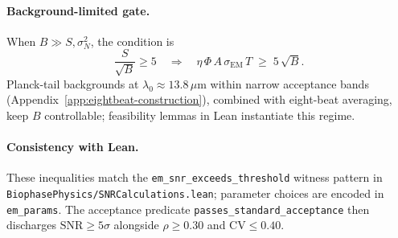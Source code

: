 \documentclass[12pt,a4paper]{article}
\begin{document}
\paragraph{Background-limited gate.}
When \(B\gg S,\sigma_N^2\), the condition is
\[
  \frac{S}{\sqrt{B}}\ge 5
  \quad\Rightarrow\quad
  \eta\,\Phi\,A\,\sigma_{\mathrm{EM}}\,T \;\ge\; 5\,\sqrt{B}.
\]
Planck-tail backgrounds at \(\lambda_0\approx 13.8\,\mu\mathrm{m}\) within narrow acceptance bands (Appendix~\ref{app:eightbeat-construction}), combined with eight-beat averaging, keep \(B\) controllable; feasibility lemmas in Lean instantiate this regime.

\paragraph{Consistency with Lean.}
These inequalities match the \texttt{em\_snr\_exceeds\_threshold} witness pattern in \texttt{BiophasePhysics/SNRCalculations.lean}; parameter choices are encoded in \texttt{em\_params}. The acceptance predicate \texttt{passes\_standard\_acceptance} then discharges \(\mathrm{SNR}\ge 5\sigma\) alongside \(\rho\ge 0.30\) and \(\mathrm{CV}\le 0.40\).
\end{document}
